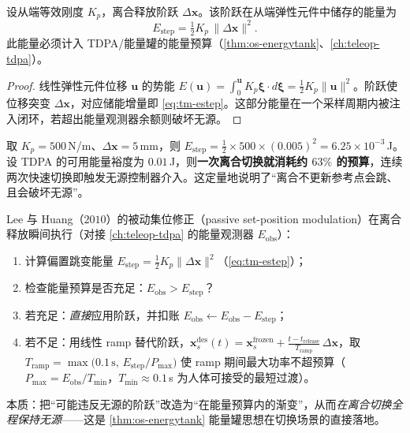 \begin{theorem}[释放阶跃的储能与能量预算]\label{thm:tm-step-energy}
设从端等效刚度 $K_p$，离合释放阶跃 $\Delta\mathbf{x}$。该阶跃在从端弹性元件中储存的能量为
\begin{equation}
  E_{\text{step}}=\tfrac12 K_p\,\|\Delta\mathbf{x}\|^2.
  \label{eq:tm-estep}
\end{equation}
此能量必须计入 TDPA/能量罐的能量预算（\cref{thm:os-energytank}、\cref{ch:teleop-tdpa}）。
\end{theorem}
\begin{proof}
线性弹性元件位移 $\mathbf{u}$ 的势能 $E(\mathbf{u})=\int_0^{\mathbf{u}}K_p\boldsymbol{\xi}\cdot d\boldsymbol{\xi}=\tfrac12 K_p\|\mathbf{u}\|^2$。阶跃使位移突变 $\Delta\mathbf{x}$，对应储能增量即 \cref{eq:tm-estep}。这部分能量在一个采样周期内被注入闭环，若超出能量观测器余额则破坏无源。
\end{proof}

\begin{note}[一次离合可能吃掉大半能量预算]
取 $K_p=500\,$N/m、$\Delta\mathbf{x}=5\,$mm，则 $E_{\text{step}}=\tfrac12\times 500\times(0.005)^2=6.25\times10^{-3}\,$J。设 TDPA 的可用能量裕度为 $0.01\,$J，则\textbf{一次离合切换就消耗约 $63\%$ 的预算}，连续两次快速切换即触发无源控制器介入。这定量地说明了“离合不更新参考点会跳、且会破坏无源”。
\end{note}

\begin{algo}\label{algo:tm-pspm}
Lee 与 Huang（$2010$）的被动集位修正（passive set-position modulation）在离合释放瞬间执行（对接 \cref{ch:teleop-tdpa} 的能量观测器 $E_{\text{obs}}$）：
\begin{enumerate}
  \item 计算偏置跳变能量 $E_{\text{step}}=\tfrac12 K_p\|\Delta\mathbf{x}\|^2$（\cref{eq:tm-estep}）；
  \item 检查能量预算是否充足：$E_{\text{obs}}>E_{\text{step}}$？
  \item 若充足：\emph{直接}应用阶跃，并扣账 $E_{\text{obs}}\leftarrow E_{\text{obs}}-E_{\text{step}}$；
  \item 若不足：用线性 ramp 替代阶跃，$\mathbf{x}_s^{\text{des}}(t)=\mathbf{x}_s^{\text{frozen}}+\frac{t-t_{\text{release}}}{T_{\text{ramp}}}\,\Delta\mathbf{x}$，取 $T_{\text{ramp}}=\max\!\big(0.1\,\text{s},\,E_{\text{step}}/P_{\max}\big)$ 使 ramp 期间最大功率不超预算（$P_{\max}=E_{\text{obs}}/T_{\min}$，$T_{\min}\approx0.1\,$s 为人体可接受的最短过渡）。
\end{enumerate}
本质：把“可能违反无源的阶跃”改造为“在能量预算内的渐变”，从而\emph{在离合切换全程保持无源}——这是 \cref{thm:os-energytank} 能量罐思想在切换场景的直接落地。
\end{algo}

